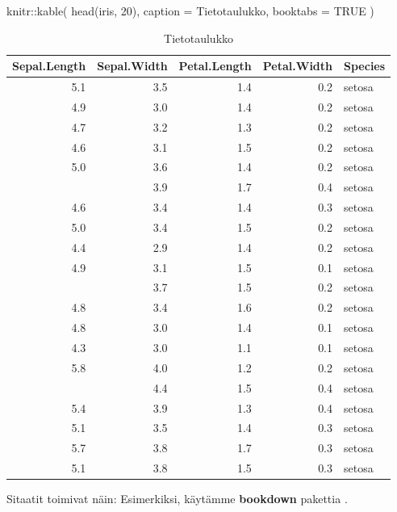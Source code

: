\documentclass[
]{book}
\newenvironment{Shaded}{\begin{snugshade}}{\end{snugshade}}
\newcommand{\AttributeTok}[1]{\textcolor[rgb]{0.77,0.63,0.00}{#1}}
\newcommand{\ConstantTok}[1]{\textcolor[rgb]{0.00,0.00,0.00}{#1}}
\newcommand{\DecValTok}[1]{\textcolor[rgb]{0.00,0.00,0.81}{#1}}
\newcommand{\FunctionTok}[1]{\textcolor[rgb]{0.00,0.00,0.00}{#1}}
\newcommand{\NormalTok}[1]{#1}
\newcommand{\SpecialCharTok}[1]{\textcolor[rgb]{0.00,0.00,0.00}{#1}}
\newcommand{\StringTok}[1]{\textcolor[rgb]{0.31,0.60,0.02}{#1}}
\theoremstyle{definition}
\theoremstyle{definition}
\theoremstyle{definition}
\theoremstyle{definition}
\theoremstyle{remark}
\begin{document}
\begin{Shaded}
\begin{Highlighting}[]
\NormalTok{knitr}\SpecialCharTok{::}\FunctionTok{kable}\NormalTok{(}
  \FunctionTok{head}\NormalTok{(iris, }\DecValTok{20}\NormalTok{), }\AttributeTok{caption =} \StringTok{\textquotesingle{}Tietotaulukko\textquotesingle{}}\NormalTok{,}
  \AttributeTok{booktabs =} \ConstantTok{TRUE}
\NormalTok{)}
\end{Highlighting}
\end{Shaded}

\begin{table}

\caption{\label{tab:nice-tab}Tietotaulukko}
\centering
\begin{tabular}[t]{rrrrl}
\toprule
Sepal.Length & Sepal.Width & Petal.Length & Petal.Width & Species\\
\midrule
5.1 & 3.5 & 1.4 & 0.2 & setosa\\
4.9 & 3.0 & 1.4 & 0.2 & setosa\\
4.7 & 3.2 & 1.3 & 0.2 & setosa\\
4.6 & 3.1 & 1.5 & 0.2 & setosa\\
5.0 & 3.6 & 1.4 & 0.2 & setosa\\
\addlinespace
5.4 & 3.9 & 1.7 & 0.4 & setosa\\
4.6 & 3.4 & 1.4 & 0.3 & setosa\\
5.0 & 3.4 & 1.5 & 0.2 & setosa\\
4.4 & 2.9 & 1.4 & 0.2 & setosa\\
4.9 & 3.1 & 1.5 & 0.1 & setosa\\
\addlinespace
5.4 & 3.7 & 1.5 & 0.2 & setosa\\
4.8 & 3.4 & 1.6 & 0.2 & setosa\\
4.8 & 3.0 & 1.4 & 0.1 & setosa\\
4.3 & 3.0 & 1.1 & 0.1 & setosa\\
5.8 & 4.0 & 1.2 & 0.2 & setosa\\
\addlinespace
5.7 & 4.4 & 1.5 & 0.4 & setosa\\
5.4 & 3.9 & 1.3 & 0.4 & setosa\\
5.1 & 3.5 & 1.4 & 0.3 & setosa\\
5.7 & 3.8 & 1.7 & 0.3 & setosa\\
5.1 & 3.8 & 1.5 & 0.3 & setosa\\
\bottomrule
\end{tabular}
\end{table}

Sitaatit toimivat näin: Esimerkiksi, käytämme \textbf{bookdown} pakettia \citep{R-bookdown}.
\end{document}
